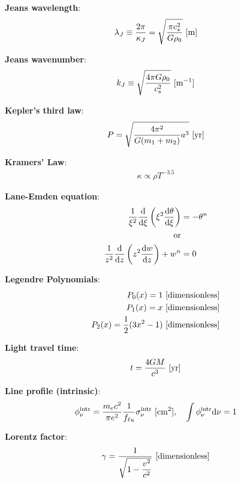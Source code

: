 \documentclass[a4paper,10pt]{article}
\begin{document}
{\noindent}\textbf{Jeans wavelength}:
\begin{align*}
    \lambda_J \equiv \frac{2\pi}{\kappa_J} = \sqrt{\frac{\pi c_s^2}{G\rho_0}} ~ [{\rm m}]
\end{align*}

{\noindent}\textbf{Jeans wavenumber}:
\begin{align*}
    k_J \equiv \sqrt{\frac{4\pi G\rho_0}{c_s^2}} ~ [{\rm m^{-1}}]
\end{align*}

{\noindent}\textbf{Kepler's third law}:
\begin{align*}
    P = \sqrt{\frac{4\pi^2}{G(m_1+m_2)}a^3} ~ [{\rm yr}]
\end{align*}

{\noindent}\textbf{Kramers' Law}:
\begin{align*}
    \kappa \propto \rho T^{-3.5}
\end{align*}

{\noindent}\textbf{Lane-Emden equation}:
\begin{align*}
    \frac{1}{\xi^2}\frac{{\rm d}}{{\rm d}\xi} \left(\xi^2\frac{{\rm d}\theta}{{\rm d}\xi}\right) &= -\theta^n \\
    {\rm or} \\
    \frac{1}{z^2}\frac{{\rm d}}{{\rm d}z} \left(z^2 \frac{{\rm d}w}{{\rm d}z}\right) + w^n &= 0
\end{align*}

{\noindent}\textbf{Legendre Polynomials}:
\begin{align*}
    P_0(x) = 1 ~ [{\rm dimensionless}] \\
    P_1(x) = x ~ [{\rm dimensionless}] \\
    P_2(x) = \frac{1}{2}(3x^2-1) ~ [{\rm dimensionless}]
\end{align*}

{\noindent}\textbf{Light travel time}:
\begin{align*}
    t = \frac{4GM}{c^3} ~ [{\rm yr}]
\end{align*}

{\noindent}\textbf{Line profile (intrinsic)}:
\begin{align*}
     \phi_\nu^{\rm intr} = \frac{m_ec^2}{\pi e^2}\frac{1}{f_{\ell u}} \sigma_\nu^{\rm intr} ~ [{\rm cm^2}], ~~~ \int\phi_\nu^{\rm intr}{\rm d}\nu =1
\end{align*}

{\noindent}\textbf{Lorentz factor}:
\begin{align*}
    \gamma = \frac{1}{\sqrt{1-\dfrac{v^2}{c^2}}} ~ [{\rm dimensionless}]
\end{align*}
\end{document}

